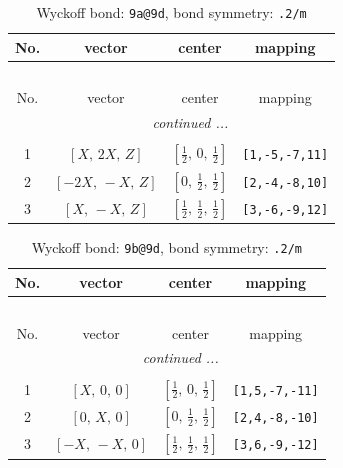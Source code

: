\documentclass[fleqn,8pt]{jsarticle}
\begin{document}
\begin{longtable}{cccc}
\caption{Wyckoff bond: {\tt 9a@9d}, bond symmetry: {\tt .2/m}}
 \\
 \hline \hline
No. & vector & center & mapping \\ \hline \endfirsthead

\multicolumn{3}{l}{\tablename\ \thetable{}} \\
 \hline \hline
No. & vector & center & mapping \\ \hline \endhead

 \hline \hline
\multicolumn{3}{r}{\footnotesize\it continued ...} \\ \endfoot

 \hline \hline
\multicolumn{3}{r}{} \\ \endlastfoot

1 & $\left[ X,\, 2 X,\, Z \right]$ & $\left[ \frac{1}{2},\, 0,\, \frac{1}{2} \right]$ & {\tt [1,-5,-7,11]} \\ \hline
2 & $\left[ - 2 X,\, - X,\, Z \right]$ & $\left[ 0,\, \frac{1}{2},\, \frac{1}{2} \right]$ & {\tt [2,-4,-8,10]} \\ \hline
3 & $\left[ X,\, - X,\, Z \right]$ & $\left[ \frac{1}{2},\, \frac{1}{2},\, \frac{1}{2} \right]$ & {\tt [3,-6,-9,12]} \\
\end{longtable}
\renewcommand{\arraystretch}{1.2}
\begin{longtable}{cccc}
\caption{Wyckoff bond: {\tt 9b@9d}, bond symmetry: {\tt .2/m}}
 \\
 \hline \hline
No. & vector & center & mapping \\ \hline \endfirsthead

\multicolumn{3}{l}{\tablename\ \thetable{}} \\
 \hline \hline
No. & vector & center & mapping \\ \hline \endhead

 \hline \hline
\multicolumn{3}{r}{\footnotesize\it continued ...} \\ \endfoot

 \hline \hline
\multicolumn{3}{r}{} \\ \endlastfoot

1 & $\left[ X,\, 0,\, 0 \right]$ & $\left[ \frac{1}{2},\, 0,\, \frac{1}{2} \right]$ & {\tt [1,5,-7,-11]} \\ \hline
2 & $\left[ 0,\, X,\, 0 \right]$ & $\left[ 0,\, \frac{1}{2},\, \frac{1}{2} \right]$ & {\tt [2,4,-8,-10]} \\ \hline
3 & $\left[ - X,\, - X,\, 0 \right]$ & $\left[ \frac{1}{2},\, \frac{1}{2},\, \frac{1}{2} \right]$ & {\tt [3,6,-9,-12]} \\
\end{longtable}
\end{document}
